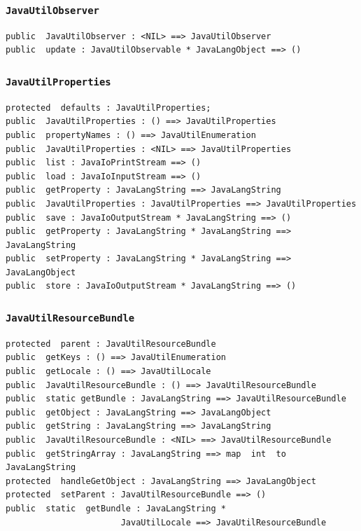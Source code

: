 \documentclass[\pformat,12pt]{article}
\begin{document}
\subsubsection{\texttt{JavaUtilObserver}}
\begin{small}
\begin{verbatim}
public  JavaUtilObserver : <NIL> ==> JavaUtilObserver
public  update : JavaUtilObservable * JavaLangObject ==> ()
\end{verbatim}
\end{small}

\subsubsection{\texttt{JavaUtilProperties}}
\begin{small}
\begin{verbatim}
protected  defaults : JavaUtilProperties;
public  JavaUtilProperties : () ==> JavaUtilProperties
public  propertyNames : () ==> JavaUtilEnumeration
public  JavaUtilProperties : <NIL> ==> JavaUtilProperties
public  list : JavaIoPrintStream ==> ()
public  load : JavaIoInputStream ==> ()
public  getProperty : JavaLangString ==> JavaLangString
public  JavaUtilProperties : JavaUtilProperties ==> JavaUtilProperties
public  save : JavaIoOutputStream * JavaLangString ==> ()
public  getProperty : JavaLangString * JavaLangString ==> JavaLangString
public  setProperty : JavaLangString * JavaLangString ==> JavaLangObject
public  store : JavaIoOutputStream * JavaLangString ==> ()
\end{verbatim}
\end{small}

\subsubsection{\texttt{JavaUtilResourceBundle}}
\begin{small}
\begin{verbatim}
protected  parent : JavaUtilResourceBundle
public  getKeys : () ==> JavaUtilEnumeration
public  getLocale : () ==> JavaUtilLocale
public  JavaUtilResourceBundle : () ==> JavaUtilResourceBundle
public  static getBundle : JavaLangString ==> JavaUtilResourceBundle
public  getObject : JavaLangString ==> JavaLangObject
public  getString : JavaLangString ==> JavaLangString
public  JavaUtilResourceBundle : <NIL> ==> JavaUtilResourceBundle
public  getStringArray : JavaLangString ==> map  int  to  JavaLangString
protected  handleGetObject : JavaLangString ==> JavaLangObject
protected  setParent : JavaUtilResourceBundle ==> ()
public  static  getBundle : JavaLangString * 
                       JavaUtilLocale ==> JavaUtilResourceBundle
\end{verbatim}
\end{small}
\end{document}
